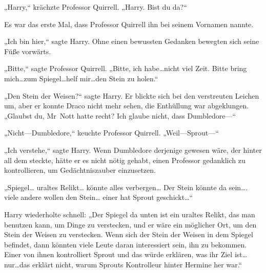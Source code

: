 „Harry,“ krächzte Professor Quirrell. „Harry. Bist du da?“

Es war das erste Mal, dass Professor Quirrell ihn bei seinem Vornamen nannte.

„Ich bin hier,“ sagte Harry. Ohne einen bewussten Gedanken bewegten sich seine Füße vorwärts.

„Bitte,“ sagte Professor Quirrell. „Bitte, ich habe…nicht viel Zeit. Bitte bring mich…zum Spiegel…helf mir…den Stein zu holen.“

„Den Stein der Weisen?“ sagte Harry.
Er blickte sich bei den verstreuten Leichen um, aber er konnte Draco nicht mehr sehen, die Enthüllung war abgeklungen. „Glaubst du, Mr~Nott hatte recht? Ich glaube nicht, dass Dumbledore—“

„Nicht—Dumbledore,“ keuchte Professor Quirrell. „Weil—Sprout—“

„Ich verstehe,“ sagte Harry.
Wenn Dumbledore derjenige gewesen wäre, der hinter all dem steckte, hätte er es nicht nötig gehabt, einen Professor gedanklich zu kontrollieren, um Gedächtniszauber einzusetzen.

„Spiegel… uraltes Relikt… könnte alles verbergen… Der Stein könnte da sein…. viele andere wollen den Stein… einer hat Sprout geschickt…“

Harry wiederholte schnell:
„Der Spiegel da unten ist ein uraltes Relikt, das man benutzen kann, um Dinge zu verstecken, und er wäre ein möglicher Ort, um den Stein der Weisen zu verstecken. Wenn sich der Stein der Weisen in dem Spiegel befindet, dann könnten viele Leute daran interessiert sein, ihn zu bekommen. Einer von ihnen kontrolliert Sprout und das würde erklären, was ihr Ziel ist…nur…das erklärt nicht, warum Sprouts Kontrolleur hinter Hermine her war.“

